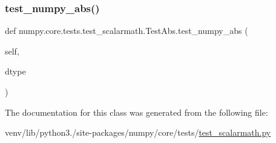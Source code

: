 \mbox{\label{classnumpy_1_1core_1_1tests_1_1test__scalarmath_1_1TestAbs_af938a93e74a3d5d13735d5c15c204c6f}} 
\subsubsection{\texorpdfstring{test\+\_\+numpy\+\_\+abs()}{test\_numpy\_abs()}}
{\footnotesize\ttfamily def numpy.\+core.\+tests.\+test\+\_\+scalarmath.\+Test\+Abs.\+test\+\_\+numpy\+\_\+abs (\begin{DoxyParamCaption}\item[{}]{self,  }\item[{}]{dtype }\end{DoxyParamCaption})}



The documentation for this class was generated from the following file\+:\begin{DoxyCompactItemize}
\item 
venv/lib/python3./site-\/packages/numpy/core/tests/\hyperlink{test__scalarmath_8py}{test\+\_\+scalarmath.\+py}\end{DoxyCompactItemize}
